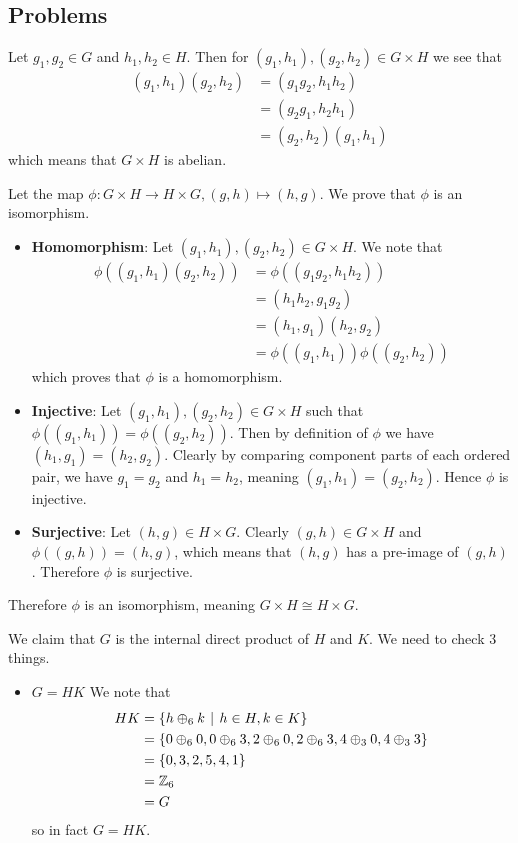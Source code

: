 \subsection*{Problems}
\begin{questions}
    \item Let $g_1, g_2 \in G$ and $h_1, h_2 \in H$. Then for $(g_1, h_1), (g_2, h_2) \in G\times H$ we see that
    \begin{align*}
        (g_1, h_1)(g_2, h_2) &= (g_1g_2, h_1h_2)\\
        &= (g_2g_1, h_2h_1)\\
        &= (g_2,h_2)(g_1,h_1)
    \end{align*}
    which means that $G \times H$ is abelian.

    \item Let the map $\phi: G\times H \to H \times G, (g, h) \mapsto (h, g)$. We prove that $\phi$ is an isomorphism.
    \begin{itemize}
        \item \textbf{Homomorphism}: Let $(g_1, h_1), (g_2, h_2) \in G \times H$. We note that
        \begin{align*}
            \phi((g_1, h_1)(g_2, h_2)) &= \phi((g_1g_2, h_1h_2))\\
            &= (h_1h_2, g_1g_2)\\
            &= (h_1, g_1)(h_2, g_2)\\
            &= \phi((g_1, h_1))\phi((g_2, h_2))
        \end{align*}
        which proves that $\phi$ is a homomorphism.
        \item \textbf{Injective}: Let $(g_1, h_1), (g_2, h_2) \in G \times H$ such that $\phi((g_1, h_1)) = \phi((g_2, h_2))$. Then by definition of $\phi$ we have $(h_1, g_1) = (h_2, g_2)$. Clearly by comparing component parts of each ordered pair, we have $g_1 = g_2$ and $h_1 = h_2$, meaning $(g_1, h_1) = (g_2, h_2)$. Hence $\phi$ is injective.
        \item \textbf{Surjective}: Let $(h, g) \in H \times G$. Clearly $(g, h) \in G \times H$ and $\phi((g, h)) = (h, g)$, which means that $(h, g)$ has a pre-image of $(g, h)$. Therefore $\phi$ is surjective.
    \end{itemize}
    Therefore $\phi$ is an isomorphism, meaning $G \times H \cong H \times G$.

    \item We claim that $G$ is the internal direct product of $H$ and $K$. We need to check 3 things.
    \begin{itemize}
        \item $\boxed{G = HK}$ We note that
        \begin{align*}
            HK &= \{h \oplus_6 k \vert h \in H, k \in K\}\\
            &= \{0 \oplus_6 0, 0 \oplus_6 3, 2 \oplus_6 0, 2 \oplus_6 3, 4 \oplus_3 0, 4 \oplus_3 3\}\\
            &= \{0, 3, 2, 5, 4, 1\}\\
            &= \Z_6\\
            &= G
        \end{align*}
        so in fact $G = HK$.


\end{itemize}
\end{questions}
